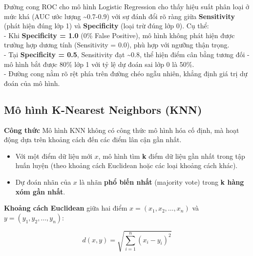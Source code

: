 \documentclass[
]{article}
\providecommand{\tightlist}{%
  \setlength{\itemsep}{0pt}\setlength{\parskip}{0pt}}
\begin{document}
Đường cong ROC cho mô hình Logistic Regression cho thấy hiệu suất phân
loại ở mức khá (AUC ước lượng \textasciitilde0.7-0.9) với sự đánh đổi rõ
ràng giữa \textbf{Sensitivity} (phát hiện đúng lớp 1) và
\textbf{Specificity} (loại trừ đúng lớp 0). Cụ thể:\\
- Khi \textbf{Specificity = 1.0} (0\% False Positive), mô hình không
phát hiện được trường hợp dương tính (Sensitivity = 0.0), phù hợp với
ngưỡng thận trọng.\\
- Tại \textbf{Specificity = 0.5}, Sensitivity đạt \textasciitilde0.8,
thể hiện điểm cân bằng tương đối - mô hình bắt được 80\% lớp 1 với tỷ lệ
dự đoán sai lớp 0 là 50\%.\\
- Đường cong nằm rõ rệt phía trên đường chéo ngẫu nhiên, khẳng định giá
trị dự đoán của mô hình.

\subsection{Mô hình K-Nearest Neighbors (KNN)}\label{sec-knn}

\textbf{Công thức} Mô hình KNN không có công thức mô hình hóa cố định,
mà hoạt động dựa trên khoảng cách đến các điểm lân cận gần nhất.

\begin{itemize}
\tightlist
\item
  Với một điểm dữ liệu mới \(x\), mô hình tìm \textbf{k} điểm dữ liệu
  gần nhất trong tập huấn luyện (theo khoảng cách Euclidean hoặc các
  loại khoảng cách khác).
\item
  Dự đoán nhãn của \(x\) là nhãn \textbf{phổ biến nhất} (majority vote)
  trong \textbf{k hàng xóm gần nhất}.
\end{itemize}

\textbf{Khoảng cách Euclidean} giữa hai điểm
\(x = (x_1, x_2, \ldots, x_n)\) và \(y = (y_1, y_2, \ldots, y_n)\):

\[
d(x, y) = \sqrt{ \sum_{i=1}^{n} (x_i - y_i)^2 }
\]
\end{document}
